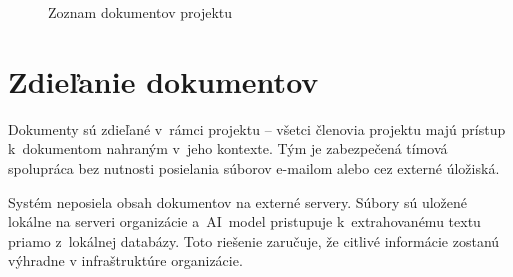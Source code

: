 \begin{figure}[H]
  \centering
  \caption{Zoznam dokumentov projektu}
  \label{fig:dokumenty}
\end{figure}

\section{Zdieľanie dokumentov}

        Dokumenty sú zdieľané v~rámci projektu -- všetci členovia projektu majú
prístup k~dokumentom nahraným v~jeho kontexte. Tým je zabezpečená tímová
spolupráca bez nutnosti posielania súborov e-mailom alebo cez externé úložiská.

        Systém neposiela obsah dokumentov na externé servery. Súbory sú uložené
lokálne na serveri organizácie a~AI~model pristupuje k~extrahovanému textu
priamo z~lokálnej databázy. Toto riešenie zaručuje, že citlivé informácie zostanú výhradne
v infraštruktúre organizácie.
